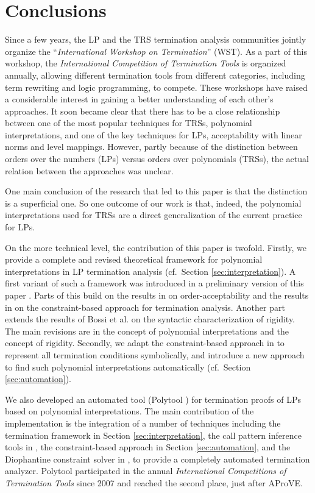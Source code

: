\documentclass[envcountsame]{tlp}
\newcounter{ex:der-lastsymconsctr}
\begin{document}
\section{Conclusions}\label{conclusion}
Since a few years, the LP  and the TRS
termination analysis communities jointly organize the ``\emph{International Workshop on
Termination}'' (WST). As a part of this workshop, the
\emph{International Competition of
Termination Tools} is organized annually,
allowing different termination tools from different categories, including
term rewriting and logic programming, to compete.
These workshops have raised a
considerable interest in 
gaining a better understanding of each other's approaches. It soon became clear
that there has to be a close relationship between one of the most popular
techniques for TRSs, polynomial interpretations, and one of the key techniques
for LPs, acceptability with linear norms and level mappings. However,
partly because of the distinction between orders over the numbers
(LPs) versus orders over polynomials (TRSs), the actual relation between the
approaches was unclear. 

One
main conclusion of the research that led to this paper is that the
distinction is a superficial one. 
So one outcome of our work is that,
indeed, the polynomial interpretations used for TRSs are a direct generalization of
the current practice for LPs. 

On the more technical level, the contribution of this paper is
twofold. Firstly, we provide a complete and revised theoretical framework for
polynomial interpretations in LP 
termination analysis (cf.\ Section \ref{sec:interpretation}). A first variant
of such a framework was introduced in a preliminary version of 
this paper \cite{MNTDannyd05}. Parts of this build on the results in
\cite{DeSchreyeSerebrenik01} on order-acceptability and the results in \cite{Decorteetal98}
	on the constraint-based approach for termination analysis. Another part extends the
results of Bossi et al. \cite{Bossietal91} on the syntactic characterization of
rigidity. The main revisions are in the concept of polynomial interpretations
and the concept of rigidity. Secondly, we adapt the constraint-based approach
in \cite{Decorteetal98} to represent all termination conditions symbolically, and introduce
a new approach to find such polynomial interpretations
automatically (cf.\ Section \ref{sec:automation}).

We also developed an automated tool (\textsf{Polytool}
\cite{Nguyen&DeSchreye06}) for termination proofs of LPs 
based on polynomial interpretations. 
The main contribution of the implementation
is the integration of a number of techniques including the termination
framework in Section \ref{sec:interpretation}, the call pattern inference tools in
\cite{Bruynoogheetal05,GallagherHB05,HeatonACK00,Janssensetal92},
the constraint-based approach
in Section \ref{sec:automation}, and the Diophantine constraint solver in
\cite{Fuhsc07}, to provide a completely automated termination
analyzer. 
\textsf{Polytool} participated in the annual \emph{International 
Competitions of Termination Tools} since 2007 and reached the second place, just after
\textsf{AProVE}.
\end{document}
